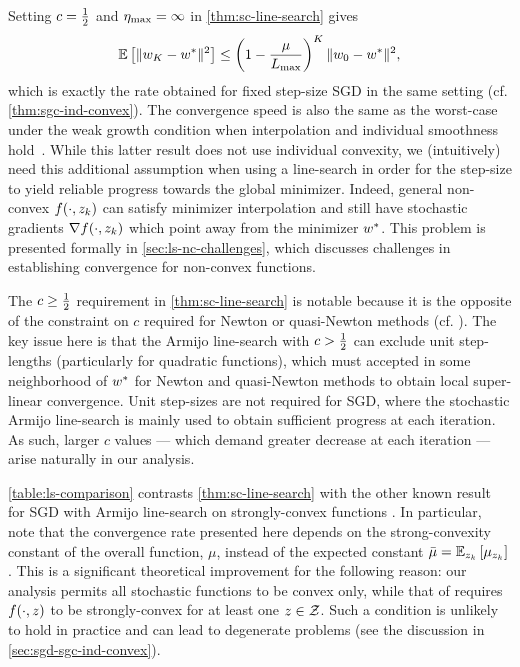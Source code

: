 Setting \( c = \frac 1 2 \) and \( \eta_{\text{max}} = \infty \) in \autoref{thm:sc-line-search} gives  
\[ \mathbb{E}\left[\|w_{K} - w^*\|^2\right] \leq \left(1 - \frac{\mu}{L_{\text{max}}}\right)^K \|w_0 - w^*\|^2, \]
which is exactly the rate obtained for fixed step-size \ac{SGD} in the same setting (cf. \autoref{thm:sgc-ind-convex}). 
The convergence speed is also the same as the worst-case under the weak growth condition when interpolation and individual smoothness hold~\citep[Theorem 5]{vaswani2019fast}.
While this latter result does not use individual convexity, we (intuitively) need this additional assumption when using a line-search in order for the step-size to yield reliable progress towards the global minimizer.
Indeed, general non-convex \( f(\cdot, z_{k}) \) can satisfy minimizer interpolation and still have stochastic gradients \( \nabla f(\cdot, z_{k}) \) which point away from the minimizer \( w^* \).
This problem is presented formally in \autoref{sec:ls-nc-challenges}, which discusses challenges in establishing convergence for non-convex functions.

The \( c \geq \frac 1 2 \) requirement in \autoref{thm:sc-line-search} is notable because it is the opposite of the constraint on \( c \) required for Newton or quasi-Newton methods (cf. \citet[Theorem 3.6]{nocedal1999numerical}). 
The key issue here is that the Armijo line-search with \( c > \frac 1 2 \) can exclude unit step-lengths (particularly for quadratic functions), which must accepted in some neighborhood of \( w^* \) for Newton and quasi-Newton methods to obtain local super-linear convergence. 
Unit step-sizes are not required for \ac{SGD}, where the stochastic Armijo line-search is mainly used to obtain sufficient progress at each iteration.
As such, larger \( c \) values --- which demand greater decrease at each iteration --- arise naturally in our analysis.



\autoref{table:ls-comparison} contrasts \autoref{thm:sc-line-search} with the other known result for \ac{SGD} with Armijo line-search on strongly-convex functions \citep[Theorem 1]{vaswani2019painless}. 
In particular, note that the convergence rate presented here depends on the strong-convexity constant of the overall function, \( \mu \), instead of the expected constant \( \bar \mu = \mathbb{E}_{z_{k}} \left[\mu_{z_{k}}\right] \).
This is a significant theoretical improvement for the following reason: our analysis permits all stochastic functions to be convex only, while that of \citet{vaswani2019painless} requires \( f(\cdot, z) \) to be strongly-convex for at least one \( z \in \mathcal{Z} \).
Such a condition is unlikely to hold in practice and can lead to degenerate problems (see the discussion in \autoref{sec:sgd-sgc-ind-convex}).


